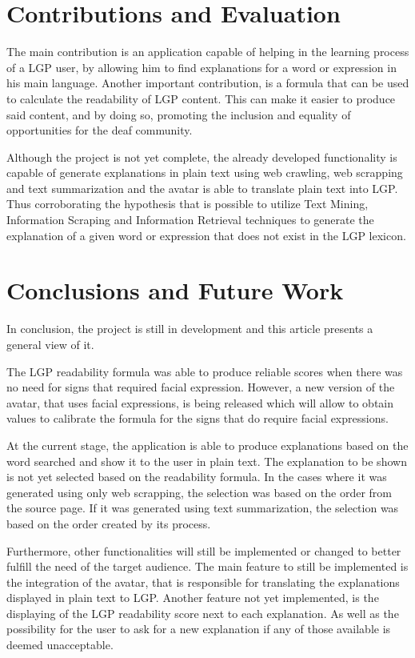 \documentclass[runningheads]{llncs}
\begin{document}
\section{Contributions and Evaluation}

The main contribution is an application capable of helping in the learning process of a LGP user, by allowing him to find explanations for a word or expression in his main language.
Another important contribution, is a formula that can be used to calculate the readability of LGP content.
This can make it easier to produce said content, and by doing so, promoting the inclusion and equality of opportunities for the deaf community.

Although the project is not yet complete, the already developed functionality is capable of generate explanations in plain text using web crawling, web scrapping and text summarization and the avatar is able to translate plain text into LGP.
Thus corroborating the hypothesis that is possible to utilize Text Mining, Information Scraping and Information Retrieval techniques to generate the explanation of a given word or expression that does not exist in the LGP lexicon.

\section{Conclusions and Future Work}

In conclusion, the project is still in development and this article presents a general view of it.

The LGP readability formula was able to produce reliable scores when there was no need for signs that required facial expression.
However, a new version of the avatar, that uses facial expressions, is being released which will allow to obtain values to calibrate the formula for the signs that do require facial expressions.

At the current stage, the application is able to produce explanations based on the word searched and show it to the user in plain text.
The explanation to be shown is not yet selected based on the readability formula.
In the cases where it was generated using only web scrapping, the selection was based on the order from the source page.
If it was generated using text summarization, the selection was based on the order created by its process.

Furthermore, other functionalities will still be implemented or changed to better fulfill the need of the target audience.
The main feature to still be implemented is the integration of the avatar, that is responsible for translating the explanations displayed in plain text to LGP.
Another feature not yet implemented, is the displaying of the LGP readability score next to each explanation.
As well as the possibility for the user to ask for a new explanation if any of those available is deemed unacceptable.
\end{document}
